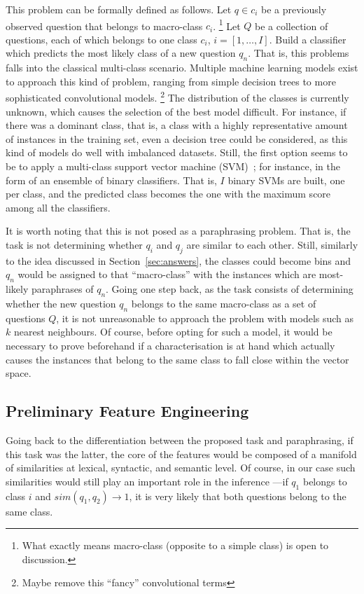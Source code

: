 \documentclass{sig-alternate-05-2015}
\newcommand{\abc}[1]{{\color{red} #1}}
\begin{document}
This problem can be formally defined as follows. Let $q\in c_i$ be a 
previously observed question that belongs to macro-class $c_i$.%
\footnote{What exactly means macro-class (opposite to a simple class) is open 
to discussion.}
Let $Q$ be a collection of questions, each of which belongs to one class 
$c_i$, $i=[1,\ldots,I]$. Build a classifier which predicts the most likely 
class of a new question $q_n$. That is, this problems falls into the classical 
multi-class scenario. Multiple machine learning models exist to approach this 
kind of problem, ranging from simple decision trees to more sophisticated 
convolutional models.%
\footnote{\abc{Maybe remove this ``fancy'' convolutional terms}}
The distribution of the classes is currently unknown, which causes the selection 
of the best model difficult. For instance, if there was a dominant class, that 
is, a class with a highly representative amount of instances in the training 
set, even a decision tree could be considered, as this kind of models do well 
with imbalanced datasets. Still, the first option seems to be to apply a 
multi-class support vector machine (SVM)~\cite{Joachims:99}; for 
instance, in the form of an ensemble of binary classifiers. That is, $I$ binary 
SVMs are built, one per class, and the predicted class becomes the one with the 
maximum score among all the classifiers. 

It is worth noting that this is not posed as a paraphrasing problem. That is, 
the task is not determining whether $q_i$ and $q_j$ are similar to each other. 
Still, similarly to the idea discussed in Section~\ref{sec:answers}, the 
classes could become bins and $q_n$ would be assigned to that ``macro-class'' 
with the instances which are most-likely paraphrases of $q_n$. Going 
one step back, as the task consists of determining whether the new 
question $q_n$ belongs to the same macro-class as a set of questions $Q$, it is 
not unreasonable to approach the problem with models such as $k$ nearest 
neighbours. Of course, before opting for such a model, it would be necessary to 
prove beforehand if a characterisation is at hand which actually causes the 
instances that belong to the same class to fall close within the vector space. 

\subsection{Preliminary Feature Engineering}

Going back to the differentiation between the proposed task and paraphrasing, 
if this task was the latter, the core of the features would be composed of a 
manifold of similarities at lexical, syntactic, and semantic level. Of course, 
in our case such similarities would still play an important role in the 
inference ---if $q_1$ belongs to class $i$ and $sim(q_1,q_2)\rightarrow 1$, it 
is very likely that both questions belong to the same class. 
\end{document}
